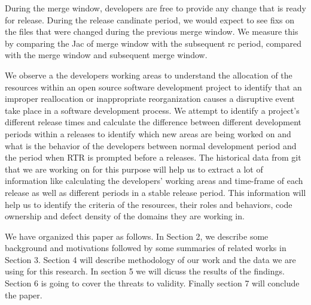\documentclass{acm_proc_article-sp}
\begin{document}
During the merge window, developers are free to provide any change that is ready for release. During the release candinate period, we would expect to see fixs on the files that were changed during the previous merge window. We measure this by comparing the Jac of merge window with the subsequent rc period, compared with the merge window and subsequent merge window.

We observe a the developers working areas to understand the allocation of the resources within an open source software development project to identify that an improper reallocation or inappropriate reorganization causes a disruptive event take place in a software development process. We attempt to identify a project's different release times and calculate the difference between different development periods within a releases to identify which new areas are being worked on and what is the behavior of the developers between normal development period and the period when RTR is prompted before a releases. The historical data from git that we are working on for this purpose will help us to extract a lot of information like calculating the developers' working areas and time-frame of each release as well as different periods in a stable release period. This information will help us to identify the criteria of the resources, their roles and behaviors, code ownership and defect density of the domains they are working in.

We have organized this paper as follows. In Section 2, we describe some background and motivations followed by some summaries of related works in Section 3. Section 4 will describe methodology of our work and the data we are using for this research. In section 5 we will dicuss the results of the findings. Section 6 is going to cover the threats to validity. Finally section 7 will conclude the paper.
\end{document}
